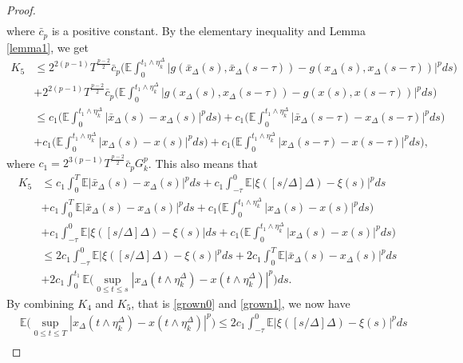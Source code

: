 \documentclass[11pt]{article}
\begin{document}
\begin{proof}
\begin{align*}
\end{align*}
where $\bar{c}_p$ is a positive constant. By the elementary inequality and Lemma \ref{lemma1}, we get
\begin{align*}
K_5&\le 2^{2(p-1)}T^{\frac{p-2}{2}} \bar{c}_p\Big(\mathbb{E}\int_{0}^{t_1\wedge \eta^{\Delta}_k}\vert g(\bar{x}_{\Delta}(s),\bar{x}_{\Delta}(s-\tau))-g(x_{\Delta}(s),x_{\Delta}(s-\tau))\vert^pds\Big)\\
&+ 2^{2(p-1)}T^{\frac{p-2}{2}} \bar{c}_p\Big(\mathbb{E}\int_{0}^{t_1\wedge \eta^{\Delta}_k}\vert  g(x_{\Delta}(s),x_{\Delta}(s-\tau))-g(x(s),x(s-\tau))\vert^pds\Big)\\
&\le c_1\Big(\mathbb{E}\int_{0}^{t_1\wedge \eta^{\Delta}_k}\vert \bar{x}_{\Delta}(s)-x_{\Delta}(s)\vert^pds\Big)+ c_1\Big(\mathbb{E}\int_{0}^{t_1\wedge \eta^{\Delta}_k}\vert \bar{x}_{\Delta}(s-\tau)-x_{\Delta}(s-\tau)\vert^pds\Big)\\
&+c_1\Big(\mathbb{E}\int_{0}^{t_1\wedge \eta^{\Delta}_k}\vert x_{\Delta}(s)-x(s)\vert^pds\Big)+c_1\Big(\mathbb{E}\int_{0}^{t_1\wedge \eta^{\Delta}_k}\vert x_{\Delta}(s-\tau)-x(s-\tau)\vert^pds\Big),
\end{align*}
where $c_1=2^{3(p-1)}T^{\frac{p-2}{2}} \bar{c}_pG^p_k$. This also means that 
\begin{align}\label{grown1}
K_5&\le c_1\int_{0}^T\mathbb{E}\vert \bar{x}_{\Delta}(s)-x_{\Delta}(s)\vert^pds+c_1\int_{-\tau}^0\mathbb{E}|\xi([s/\Delta]\Delta)-\xi(s)|^pds\nonumber\\
&+c_1\int_{0}^T\mathbb{E}\vert \bar{x}_{\Delta}(s)-x_{\Delta}(s)\vert^pds+ c_1\Big(\mathbb{E}\int_{0}^{t_1\wedge \eta^{\Delta}_k}\vert x_{\Delta}(s)-x(s)\vert^pds\Big)\nonumber\\
&+c_1\int_{-\tau}^0\mathbb{E}|\xi([s/\Delta]\Delta)-\xi(s)|ds+c_1\Big(\mathbb{E}\int_{0}^{t_1\wedge \eta^{\Delta}_k}\vert x_{\Delta}(s)-x(s)\vert^pds\Big)\nonumber\\
&\le 2c_1\int_{-\tau}^0\mathbb{E}|\xi([s/\Delta]\Delta)-\xi(s)|^pds
+2c_1\int_{0}^T\mathbb{E}\vert \bar{x}_{\Delta}(s)-x_{\Delta}(s)\vert^pds\nonumber\\
&+2c_1 \int_{0}^{t_1}\mathbb{E}\Big(\sup_{0\le t\le s}|x_{\Delta}(t\wedge \eta^{\Delta}_k)-x(t\wedge \eta^{\Delta}_k)|^p\Big)ds.
\end{align}
By combining $K_4$ and $K_5$, that is \eqref{grown0} and \eqref{grown1}, we now have
\begin{align*}
&\mathbb{E}\Big( \sup_{0\leq t \leq T}|x_{\Delta}(t\wedge\eta^{\Delta}_k)-x(t \wedge \eta^{\Delta}_k)|^p  \Big)\le 2c_1\int_{-\tau}^0\mathbb{E}|\xi([s/\Delta]\Delta)-\xi(s)|^pds\\

\end{align*}
\end{proof}
\end{document}
